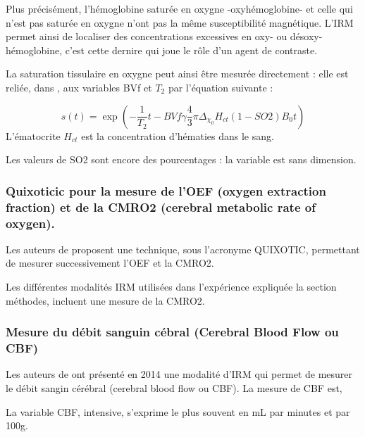 \par
Plus pr\'ecis\'ement, l'h\'emoglobine satur\'ee en oxygne -oxyh\'emoglobine- et celle qui n'est pas satur\'ee en oxygne n'ont pas la m\^eme susceptibilit\'e magn\'etique. %
L'IRM permet ainsi de localiser des concentrations excessives en oxy- ou d\'esoxy-h\'emoglobine, %
c'est cette dernire qui joue le r\^ole d'un agent de contraste.

\par
La saturation tissulaire en oxygne peut ainsi \^etre mesur\'ee directement : %
elle est reli\'ee, dans \cite{christen2012l}, aux variables BVf et $T_2$ par l'\'equation suivante :

\begin{equation}
s(t)=\exp\left(-\frac{1}{T_2}t-BVf\gamma\frac{4}{3}\pi\Delta_{\chi_0}H_{ct}(1-SO2)B_0t\right)
\label{bold_so2}
\end{equation}
L'\'ematocrite $H_{ct}$ est la concentration d'h\'ematies dans le sang.

\par
Les valeurs de SO2 sont encore des pourcentages : la variable est sans dimension.

\subsubsection{Quixoticic pour la mesure de l'OEF (oxygen extraction fraction) %
et de la CMRO2 (cerebral metabolic rate of oxygen).}

Les auteurs de \cite{quixotic} proposent une technique, sous l'acronyme QUIXOTIC, permettant de mesurer successivement l'OEF et la CMRO2.

\par
Les diff\'erentes modalit\'es IRM utilis\'ees dans l'exp\'erience expliqu\'ee  la section m\'ethodes, %
incluent une mesure de la CMRO2.

\subsubsection{Mesure du d\'ebit sanguin c\'ebral (Cerebral Blood Flow ou CBF)}

Les auteurs de \cite{cbf_alz} ont pr\'esent\'e en 2014 une modalit\'e d'IRM qui permet de mesurer le d\'ebit sangin c\'er\'ebral (cerebral blood flow ou CBF). %
La mesure de CBF est, 

\par
La variable CBF, intensive, s'exprime le plus souvent en mL par minutes et par 100g.


